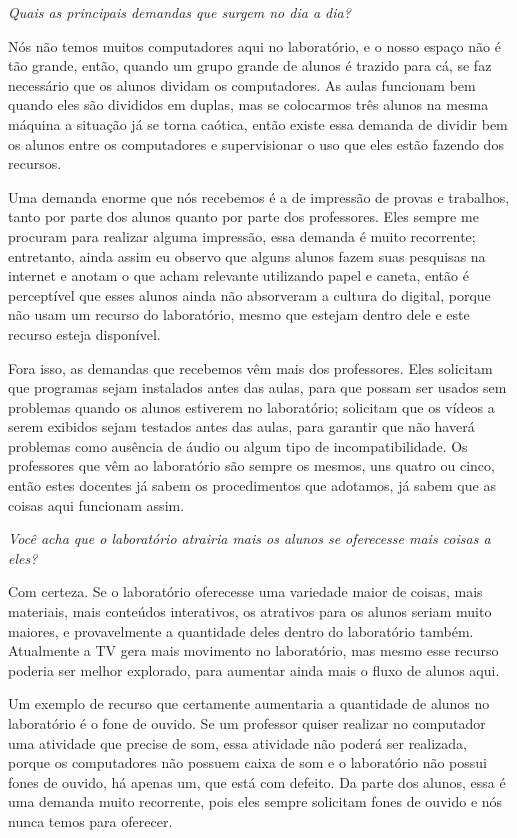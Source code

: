 \textit{Quais as principais demandas que surgem no dia a dia?}

Nós não temos muitos computadores aqui no laboratório, e o nosso espaço não é tão grande, então, quando um grupo grande de alunos é trazido para cá, se faz necessário que os alunos dividam os computadores. As aulas funcionam bem quando eles são divididos em duplas, mas se colocarmos três alunos na mesma máquina a situação já se torna caótica, então existe essa demanda de dividir bem os alunos entre os computadores e supervisionar o uso que eles estão fazendo dos recursos.

Uma demanda enorme que nós recebemos é a de impressão de provas e trabalhos, tanto por parte dos alunos quanto por parte dos professores. Eles sempre me procuram para realizar alguma impressão, essa demanda é muito recorrente; entretanto, ainda assim eu observo que alguns alunos fazem suas pesquisas na internet e anotam o que acham relevante utilizando papel e caneta, então é perceptível que esses alunos ainda não absorveram a cultura do digital, porque não usam um recurso do laboratório, mesmo que estejam dentro dele e este recurso esteja disponível.

Fora isso, as demandas que recebemos vêm mais dos professores. Eles solicitam que programas sejam instalados antes das aulas, para que possam ser usados sem problemas quando os alunos estiverem no laboratório; solicitam que os vídeos a serem exibidos sejam testados antes das aulas, para garantir que não haverá problemas como ausência de áudio ou algum tipo de incompatibilidade. Os professores que vêm ao laboratório são sempre os mesmos, uns quatro ou cinco, então estes docentes já sabem os procedimentos que adotamos, já sabem que as coisas aqui funcionam assim.

\textit{Você acha que o laboratório atrairia mais os alunos se oferecesse mais coisas a eles?}

Com certeza. Se o laboratório oferecesse uma variedade maior de coisas, mais materiais, mais conteúdos interativos, os atrativos para os alunos seriam muito maiores, e provavelmente a quantidade deles dentro do laboratório também. Atualmente a TV gera mais movimento no laboratório, mas mesmo esse recurso poderia ser melhor explorado, para aumentar ainda mais o fluxo de alunos aqui.

Um exemplo de recurso que certamente aumentaria a quantidade de alunos no laboratório é o fone de ouvido. Se um professor quiser realizar no computador uma atividade que precise de som, essa atividade não poderá ser realizada, porque os computadores não possuem caixa de som e o laboratório não possui fones de ouvido, há apenas um, que está com defeito. Da parte dos alunos, essa é uma demanda muito recorrente, pois eles sempre solicitam fones de ouvido e nós nunca temos para oferecer.

